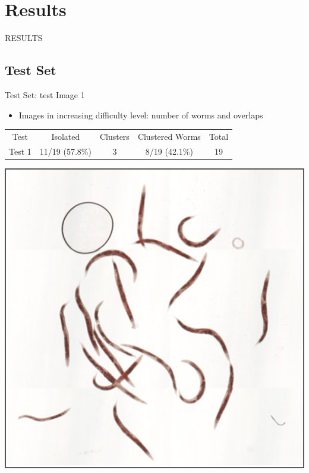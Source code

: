 \documentclass[xcolor=table]{beamer}
\begin{document}

\section{Results}
\begin{frame}{}
\begin{center}
\LARGE RESULTS
\end{center}
\end{frame}

\subsection{Test Set}
\begin{frame}{Test Set: test Image 1}

  \begin{itemize}
  \item Images in increasing difficulty level: number of worms
    and overlaps
  \end{itemize}

\begin{table}[h]
\begin{center}
\begin{tabular}[h]{|c|c|c|c|c|}
    \hline
    \rowcolor{gray!35}
    Test & Isolated & Clusters & Clustered Worms & Total\\
    Test 1 & 11/19 (57.8\%) & 3 & 8/19 (42.1\%) & 19 \\
    \hline
  \end{tabular}
\end{center}
\end{table}

\begin{center}
\includegraphics[scale=0.25]{results/test1/original}
\end{center}

\end{frame}
\end{document}

